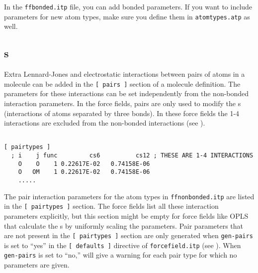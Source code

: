 

In the {\tt ffbonded.itp} file, you can add bonded parameters. If you
want to include parameters for new atom types, make sure you define
them in {\tt atomtypes.atp} as well.



\subsection{s}
\label{subsec:pairinteractions}
Extra Lennard-Jones and electrostatic interactions between pairs
of atoms in a molecule can be added in the {\tt [~pairs~]} section of
a molecule definition. The parameters for these interactions can
be set independently from the non-bonded interaction parameters.
In the {\gromos} force fields, pairs are only used
to modify the s (interactions of atoms
separated by three bonds). In these force fields the 1-4 interactions
are excluded from the non-bonded interactions (see ).

{\small
\begin{verbatim}

[ pairtypes ]
  ; i    j func         cs6          cs12 ; THESE ARE 1-4 INTERACTIONS
    O    O    1 0.22617E-02   0.74158E-06
    O   OM    1 0.22617E-02   0.74158E-06
    .....
\end{verbatim}}

The pair interaction parameters for the atom types
in {\tt ffnonbonded.itp} are listed in the {\tt [~pairtypes~]} section.
The {\gromos} force fields list all these interaction parameters
explicitly, but this section might be empty for force fields like
OPLS that calculate the s by uniformly scaling the parameters.
Pair parameters that are not present in the {\tt [~pairtypes~]} section
are only generated when {\tt gen-pairs} is set to ``yes'' in the {\tt [~defaults~]}
directive of {\tt forcefield.itp} (see ). 
When {\tt gen-pairs} is set to ``no,'' {\tt {}}
will give a warning for each pair type for which no parameters are given.

